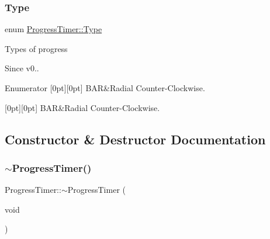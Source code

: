\subsubsection{\texorpdfstring{Type}{Type}\hspace{0.1cm}{\footnotesize\ttfamily [2/2]}}
{\footnotesize\ttfamily enum \hyperlink{classProgressTimer_a9638d092b86d51bce727621b1a70d32f}{Progress\+Timer\+::\+Type}\hspace{0.3cm}{\ttfamily [strong]}}

Types of progress \begin{DoxySince}{Since}
v0.. 
\end{DoxySince}
\begin{DoxyEnumFields}{Enumerator}
[0pt][0pt]{}\mbox{\label{classProgressTimer_a9638d092b86d51bce727621b1a70d32fa3d75eec709b70a350e143492192a1736}} 
B\+AR&Radial Counter-\/\+Clockwise. \\
\hline

[0pt][0pt]{}\mbox{\label{classProgressTimer_a9638d092b86d51bce727621b1a70d32fa3d75eec709b70a350e143492192a1736}} 
B\+AR&Radial Counter-\/\+Clockwise. \\
\hline

\end{DoxyEnumFields}


\subsection{Constructor \& Destructor Documentation}
\mbox{\label{classProgressTimer_a95ee08f7c26113454f87421f45c641b0}} 
\subsubsection{\texorpdfstring{$\sim$\+Progress\+Timer()}{~ProgressTimer()}\hspace{0.1cm}{\footnotesize\ttfamily [1/2]}}
{\footnotesize\ttfamily Progress\+Timer\+::$\sim$\+Progress\+Timer (\begin{DoxyParamCaption}\item[{void}]{ }\end{DoxyParamCaption})\hspace{0.3cm}{\ttfamily [virtual]}}

